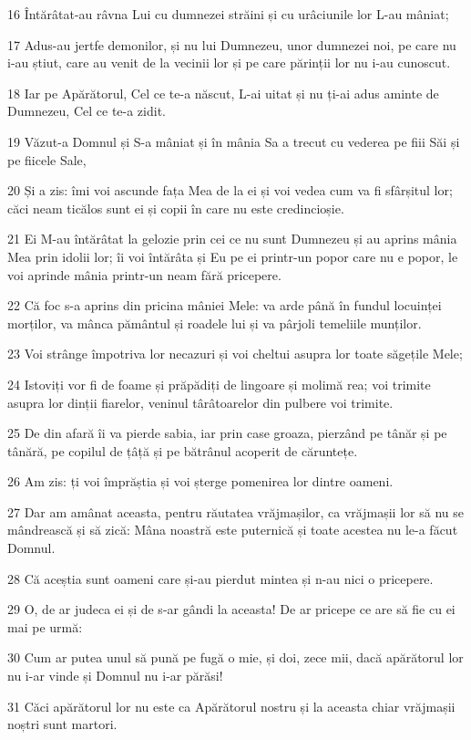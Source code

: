 \par 16 Întărâtat-au râvna Lui cu dumnezei străini și cu urâciunile lor L-au mâniat;
\par 17 Adus-au jertfe demonilor, și nu lui Dumnezeu, unor dumnezei noi, pe care nu i-au știut, care au venit de la vecinii lor și pe care părinții lor nu i-au cunoscut.
\par 18 Iar pe Apărătorul, Cel ce te-a născut, L-ai uitat și nu ți-ai adus aminte de Dumnezeu, Cel ce te-a zidit.
\par 19 Văzut-a Domnul și S-a mâniat și în mânia Sa a trecut cu vederea pe fiii Săi și pe fiicele Sale,
\par 20 Și a zis: îmi voi ascunde fața Mea de la ei și voi vedea cum va fi sfârșitul lor; căci neam ticălos sunt ei și copii în care nu este credincioșie.
\par 21 Ei M-au întărâtat la gelozie prin cei ce nu sunt Dumnezeu și au aprins mânia Mea prin idolii lor; îi voi întărâta și Eu pe ei printr-un popor care nu e popor, le voi aprinde mânia printr-un neam fără pricepere.
\par 22 Că foc s-a aprins din pricina mâniei Mele: va arde până în fundul locuinței morților, va mânca pământul și roadele lui și va pârjoli temeliile munților.
\par 23 Voi strânge împotriva lor necazuri și voi cheltui asupra lor toate săgețile Mele;
\par 24 Istoviți vor fi de foame și prăpădiți de lingoare și molimă rea; voi trimite asupra lor dinții fiarelor, veninul târâtoarelor din pulbere voi trimite.
\par 25 De din afară îi va pierde sabia, iar prin case groaza, pierzând pe tânăr și pe tânără, pe copilul de țâță și pe bătrânul acoperit de căruntețe.
\par 26 Am zis: ți voi împrăștia și voi șterge pomenirea lor dintre oameni.
\par 27 Dar am amânat aceasta, pentru răutatea vrăjmașilor, ca vrăjmașii lor să nu se mândrească și să zică: Mâna noastră este puternică și toate acestea nu le-a făcut Domnul.
\par 28 Că aceștia sunt oameni care și-au pierdut mintea și n-au nici o pricepere.
\par 29 O, de ar judeca ei și de s-ar gândi la aceasta! De ar pricepe ce are să fie cu ei mai pe urmă:
\par 30 Cum ar putea unul să pună pe fugă o mie, și doi, zece mii, dacă apărătorul lor nu i-ar vinde și Domnul nu i-ar părăsi!
\par 31 Căci apărătorul lor nu este ca Apărătorul nostru și la aceasta chiar vrăjmașii noștri sunt martori.

